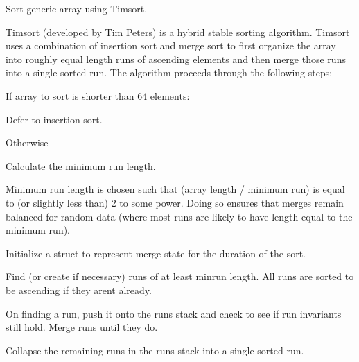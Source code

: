 Sort generic array using Timsort. 

Timsort (developed by Tim Peters) is a hybrid stable sorting algorithm. Timsort uses a combination of insertion sort and merge sort to first organize the array into roughly equal length runs of ascending elements and then merge those runs into a single sorted run. The algorithm proceeds through the following steps\+:


\begin{DoxyItemize}
\item If array to sort is shorter than 64 elements\+:
\begin{DoxyEnumerate}
\item Defer to insertion sort.
\end{DoxyEnumerate}
\item Otherwise
\begin{DoxyEnumerate}
\item Calculate the minimum run length.
\begin{DoxyItemize}
\item Minimum run length is chosen such that (array length / minimum run) is equal to (or slightly less than) 2 to some power. Doing so ensures that merges remain balanced for random data (where most runs are likely to have length equal to the minimum run).
\end{DoxyItemize}
\item Initialize a struct to represent merge state for the duration of the sort.
\item Find (or create if necessary) runs of at least minrun length. All runs are sorted to be ascending if they aren\textquotesingle{}t already.
\begin{DoxyItemize}
\item On finding a run, push it onto the runs stack and check to see if run invariants still hold. Merge runs until they do.
\end{DoxyItemize}
\item Collapse the remaining runs in the runs stack into a single sorted run.
\end{DoxyEnumerate}
\end{DoxyItemize}


